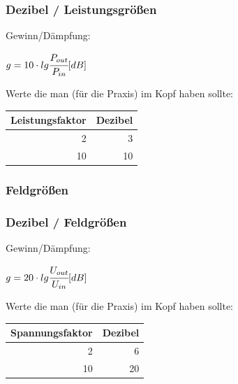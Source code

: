 \begin{frame}
    \frametitle{Dezibel / Leistungsgrößen}

    Gewinn/Dämpfung:

    \begin{center}
        $g = 10 \cdot lg \cfrac{P_{out}}{P_{in}} [dB]$
    \end{center}

    \vspace{2em}

    Werte die man (für die Praxis) im Kopf haben sollte:

    \begin{center}
    \footnotesize
    \begin{tabular}{|r|r|}\hline
        \textbf{Leistungsfaktor} & \textbf{Dezibel} \\ \hline \hline
         2                       &  3               \\ \hline
        10                       & 10               \\ \hline
    \end{tabular}
    \end{center}

\end{frame}

\subsubsection{Feldgrößen}

\begin{frame}
    \frametitle{Dezibel / Feldgrößen}


    Gewinn/Dämpfung:

    \begin{center}
        $g = 20 \cdot lg \cfrac{U_{out}}{U_{in}} [dB]$
    \end{center}

    \vspace{2em}
    
    Werte die man (für die Praxis) im Kopf haben sollte:

    \begin{center}
    \footnotesize
    \begin{tabular}{|r|r|}\hline
        \textbf{Spannungsfaktor} & \textbf{Dezibel} \\ \hline \hline
         2                       &  6               \\ \hline
        10                       & 20               \\ \hline
    \end{tabular}
    \end{center}

\end{frame}

